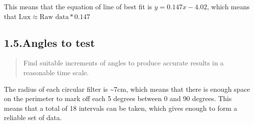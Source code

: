 \documentclass{article}
\begin{document}
\noindent{}This means that the equation of line of best fit is $y=0.147x-4.02$, which means that $\text{Lux}\approx\text{Raw data}*0.147$%

\subsection{1.5.\hspace*{0.5em}Angles to test}\label{sec-angles-to-test}%

\begin{quote}%

\noindent{}Find suitable increments of angles to produce accurate results in a reasonable time scale.%
\end{quote}%

\noindent{}The radius of each circular filter is \textasciitilde{}7cm, which means that there is enough space on the perimeter to mark off each 5 degrees between 0 and 90 degrees. This means that a total of 18 intervals can be taken, which gives enough to form a reliable set of data.%
\end{document}
